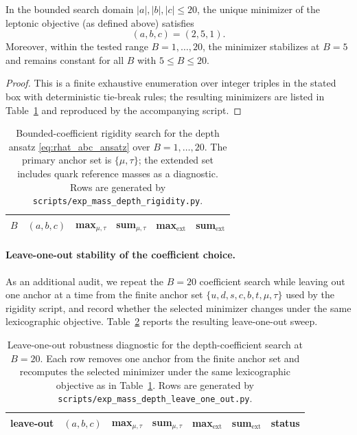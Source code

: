 \begin{proposition}\label{prop:rhat_rigidity}
In the bounded search domain $|a|,|b|,|c|\le 20$, the unique minimizer of the leptonic objective (as defined above) satisfies
\[
(a,b,c)=(2,5,1).
\]
Moreover, within the tested range $B=1,\dots,20$, the minimizer stabilizes at $B=5$ and remains constant for all $B$ with $5\le B\le 20$.
\end{proposition}
\begin{proof}
This is a finite exhaustive enumeration over integer triples in the stated box with deterministic tie-break rules; the resulting minimizers are listed in Table~\ref{tab:mass_depth_rigidity} and reproduced by the accompanying script.
\end{proof}

\begin{table}[t]
\centering
\small
\setlength{\tabcolsep}{6pt}
\renewcommand{\arraystretch}{1.15}
\begin{tabular}{rrrrrr}
\toprule
$B$ & $(a,b,c)$ & max$_{\mu,\tau}$ & sum$_{\mu,\tau}$ & max$_{\mathrm{ext}}$ & sum$_{\mathrm{ext}}$ \\
\midrule
%
\end{tabular}
\caption{Bounded-coefficient rigidity search for the depth ansatz \eqref{eq:rhat_abc_ansatz} over $B=1,\dots,20$. The primary anchor set is $\{\mu,\tau\}$; the extended set includes quark reference masses as a diagnostic. Rows are generated by \texttt{scripts/exp\_mass\_depth\_rigidity.py}.}
\label{tab:mass_depth_rigidity}
\end{table}

\paragraph{Leave-one-out stability of the coefficient choice.}
As an additional audit, we repeat the $B=20$ coefficient search while leaving out one anchor at a time from the finite anchor set $\{u,d,s,c,b,t,\mu,\tau\}$ used by the rigidity script, and record whether the selected minimizer changes under the same lexicographic objective.
Table~\ref{tab:mass_depth_leave_one_out} reports the resulting leave-one-out sweep.

\begin{table}[t]
\centering
\small
\setlength{\tabcolsep}{8pt}
\renewcommand{\arraystretch}{1.15}
\begin{tabular}{llrrrrl}
\toprule
leave-out & $(a,b,c)$ & max$_{\mu,\tau}$ & sum$_{\mu,\tau}$ & max$_{\mathrm{ext}}$ & sum$_{\mathrm{ext}}$ & status \\
\midrule
%
\end{tabular}
\caption{Leave-one-out robustness diagnostic for the depth-coefficient search at $B=20$. Each row removes one anchor from the finite anchor set and recomputes the selected minimizer under the same lexicographic objective as in Table~\ref{tab:mass_depth_rigidity}. Rows are generated by \texttt{scripts/exp\_mass\_depth\_leave\_one\_out.py}.}
\label{tab:mass_depth_leave_one_out}
\end{table}


